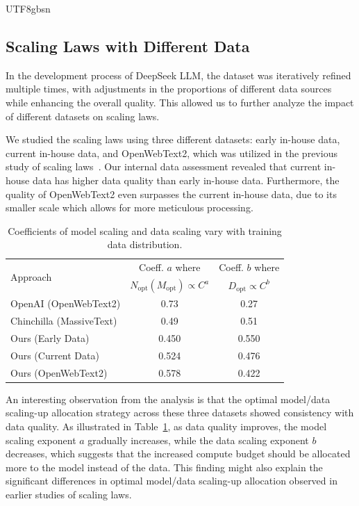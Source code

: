 \documentclass[11pt, a4paper, logo, copyright, nonumbering]{deepseek}
\begin{document}
\begin{CJK*}{UTF8}{gbsn}
\subsection{Scaling Laws with Different Data}

In the development process of DeepSeek LLM, the dataset was iteratively refined multiple times, with adjustments in the proportions of different data sources while enhancing the overall quality.
This allowed us to further analyze the impact of different datasets on scaling laws.

We studied the scaling laws using three different datasets: early in-house data, current in-house data, and OpenWebText2, which was utilized in the previous study of scaling laws~\citep{scalinglaw}. Our internal data assessment revealed that current in-house data has higher data quality than early in-house data. Furthermore, the quality of OpenWebText2 even surpasses the current in-house data, due to its smaller scale which allows for more meticulous processing.

\begin{table}[h]
    \centering
    \begin{tabular}{l|cc}
    \toprule
        \multirow{2}{*}{Approach} & Coeff. $a$ where & Coeff. $b$ where \\
        & $N_{\mathrm{opt}}(M_{\mathrm{opt}}) \propto C^a$ & $D_{\mathrm{opt}} \propto C^b$ \\
    \midrule
        OpenAI (OpenWebText2)    & 0.73 & 0.27 \\
        Chinchilla (MassiveText) & 0.49 & 0.51 \\
    \midrule
        Ours (Early Data)   & 0.450 & 0.550 \\
        Ours (Current Data) & 0.524 & 0.476 \\
        Ours (OpenWebText2) & 0.578 & 0.422 \\
    \bottomrule
    \end{tabular}
    \caption{\centering Coefficients of model scaling and data scaling vary with training data distribution.}
    \label{tab:scaling_allocate_coeff}
\end{table}

An interesting observation from the analysis is that the optimal model/data scaling-up allocation strategy across these three datasets showed consistency with data quality. As illustrated in Table~\ref{tab:scaling_allocate_coeff}, as data quality improves, the model scaling exponent $a$ gradually increases, while the data scaling exponent $b$ decreases, which suggests that the increased compute budget should be allocated more to the model instead of the data. This finding might also explain the significant differences in optimal model/data scaling-up allocation observed in earlier studies of scaling laws.


\end{CJK*}
\end{document}
